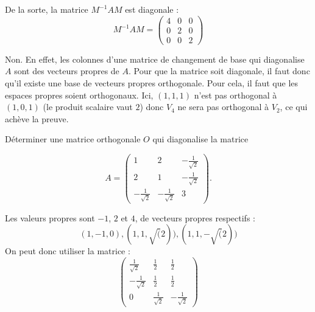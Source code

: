 \documentclass[12pt,french,oneside,a4paper]{memoir} %
\begin{document}
\begin{exo}
\begin{correction}
\begin{enumerate}
\begin{equation*}
  \end{equation*}
  De la sorte, la matrice $M^{-1} A M$ est diagonale :
  \begin{equation*}
    M^{-1} A M = \begin{pmatrix}
      4 & 0 & 0\\ 0 & 2 & 0 \\ 0 & 0 & 2
    \end{pmatrix}
  \end{equation*}
\end{enumerate}
\item Non. En effet, les colonnes d'une matrice de changement de base qui diagonalise $A$ sont des vecteurs propres de $A$. Pour que la matrice soit diagonale, il faut donc qu'il existe une base de vecteurs propres orthogonale. Pour cela, il faut que les espaces propres soient orthogonaux. Ici, $(1,1,1)$ n'est pas orthogonal à $(1,0,1)$ (le produit scalaire vaut $2$) donc $V_{4}$ ne sera pas orthogonal à $V_{2}$, ce qui achève la preuve.
\end{correction}
\end{exo}

\begin{exo} %
Déterminer une matrice orthogonale $O$ qui diagonalise la matrice

\begin{equation*}
  A = 
  \begin{pmatrix}
    1 &2 &- {\frac{1}{\sqrt{2}}} \\
    2 &1 &- {\frac{1}{\sqrt{2}}} \\
    - {\frac{1}{\sqrt{2}}} &- {\frac{1}{\sqrt{2}}} &3
  \end{pmatrix}.
\end{equation*}

\begin{correction}
  Les valeurs propres sont $-1$, $2$ et $4$, de vecteurs propres respectifs :
  \begin{equation*}
    (1, -1, 0), 
    (1, 1, \sqrt(2)), 
    (1, 1, -\sqrt(2))
  \end{equation*}
  On peut donc utiliser la matrice :
  \begin{equation*}
    \begin{pmatrix}
      \frac1{\sqrt 2}  & \frac 12          & \frac 12         \\
      -\frac1{\sqrt 2} & \frac 12          & \frac 12         \\
      0                & \frac{1}{\sqrt 2} & -\frac{1}{\sqrt 2}
    \end{pmatrix}
  \end{equation*}
\end{correction}
\end{exo}
\end{document}
